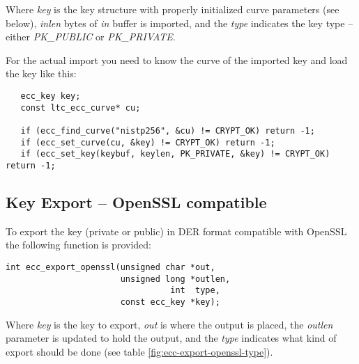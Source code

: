 \documentclass[synpaper]{book}
\begin{document}
Where \textit{key} is the key structure with properly initialized curve parameters (see below),
\textit{inlen} bytes of \textit{in} buffer is imported, and the \textit{type} indicates
the key type -- either \textit{PK\_PUBLIC} or \textit{PK\_PRIVATE}.

For the actual import you need to know the curve of the imported key and load the key like this:

\begin{small}
\begin{verbatim}
   ecc_key key;
   const ltc_ecc_curve* cu;

   if (ecc_find_curve("nistp256", &cu) != CRYPT_OK) return -1;
   if (ecc_set_curve(cu, &key) != CRYPT_OK) return -1;
   if (ecc_set_key(keybuf, keylen, PK_PRIVATE, &key) != CRYPT_OK) return -1;
\end{verbatim}
\end{small}

\subsection{Key Export -- OpenSSL compatible}
To export the key (private or public) in DER format compatible with OpenSSL the following function is provided:

\begin{verbatim}
int ecc_export_openssl(unsigned char *out,
                       unsigned long *outlen,
                                 int  type,
                       const ecc_key *key);
\end{verbatim}


Where \textit{key} is the key to export, \textit{out} is where the output is placed,
the \textit{outlen} parameter is updated to hold the output, and the \textit{type} indicates
what kind of export should be done (see table \ref{fig:ecc-export-openssl-type}).
\end{document}
